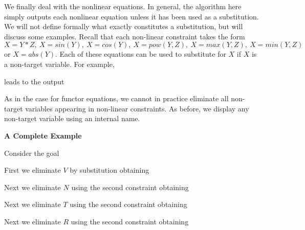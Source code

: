 We finally deal with the nonlinear equations.
In general, the algorithm here simply outputs each
nonlinear equation unless it has been used as a substitution.
We will not define formally what exactly constitutes a substitution,
but will discuss some examples.
Recall that each non-linear constraint takes the form
$X = Y * Z, ~ X = sin(Y), ~ X = cos(Y), ~
X = pow(Y, Z), ~ X = max(Y,Z), ~
X = min(Y, Z)$ or $X = abs(Y)$.  Each of these equations can be used
to substitute for $X$ if $X$ is a non-target variable. 
For example,


\noindent
leads to the output


\noindent
As in the case for functor equations, we cannot in practice
eliminate all non-target variables appearing in non-linear constraints. 
As before, we display any non-target variable using an internal name.  

\noindent
{\bf A Complete Example}

Consider the goal


\noindent
First we eliminate $V$ by substitution obtaining


\noindent
Next we eliminate $N$ using the second constraint obtaining


\noindent
Next we eliminate $T$ using the second constraint obtaining


\noindent
Next we eliminate $R$ using the second constraint obtaining


